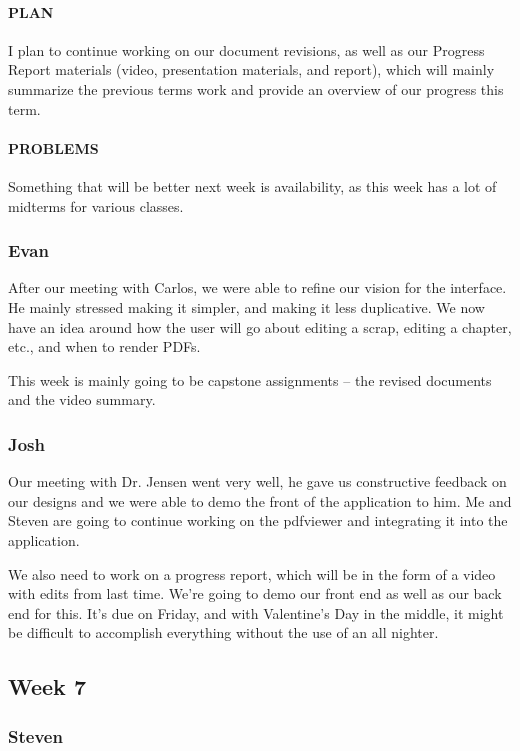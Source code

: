 \documentclass[onecolumn, draftclsnofoot,10pt, compsoc]{IEEEtran}
\begin{document}
	\paragraph{PLAN}
	I plan to continue working on our document revisions, as well as our Progress Report materials (video, presentation materials, and report), which will mainly summarize the previous terms work and provide an overview of our progress this term.
	
	\paragraph{PROBLEMS}
	Something that will be better next week is availability, as this week has a lot of midterms for various classes.
	
	\subsubsection{Evan}
	After our meeting with Carlos, we were able to refine our vision for the interface. He mainly stressed making it simpler, and making it less duplicative. We now have an idea around how the user will go about editing a scrap, editing a chapter, etc., and when to render PDFs.
	
	This week is mainly going to be capstone assignments -- the revised documents and the video summary.
	
	\subsubsection{Josh}
	Our meeting with Dr. Jensen went very well, he gave us constructive feedback on our designs and we were able to demo the front of the application to him. Me and Steven are going to continue working on the pdfviewer and integrating it into the application. 
	
	We also need to work on a progress report, which will be in the form of a video with edits from last time. We're going to demo our front end as well as our back end for this. It's due on Friday, and with Valentine's Day in the middle, it might be difficult to accomplish everything without the use of an all nighter.
\subsection{Week 7}
	\subsubsection{Steven}
\end{document}

